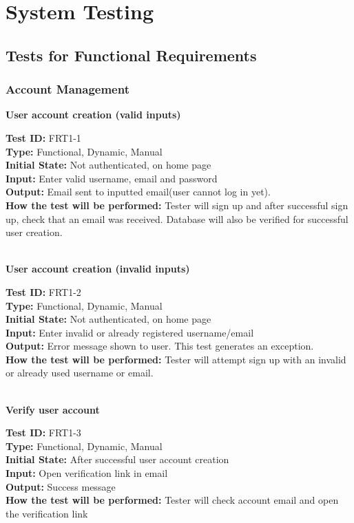 \documentclass[12pt,fleqn]{article}
\begin{document}
\pagebreak
\section{System Testing}
\subsection{Tests for Functional Requirements}
\subsubsection{Account Management}

\textbf{User account creation (valid inputs)}
\begin{tcolorbox}
\textbf{Test ID:} FRT1-1\\
\textbf{Type:} Functional, Dynamic, Manual\\
\textbf{Initial State:} Not authenticated, on home page\\
\textbf{Input:} Enter valid username, email and password\\
\textbf{Output:} Email sent to inputted email(user cannot log in yet). \\
\textbf{How the test will be performed:} Tester will sign up and after successful sign up, check that an email was received. Database will also be verified for successful user creation.
\end{tcolorbox}

\textbf{\\User account creation (invalid inputs)}
\begin{tcolorbox}
\textbf{Test ID:} FRT1-2\\
\textbf{Type:} Functional, Dynamic, Manual\\
\textbf{Initial State:} Not authenticated, on home page\\
\textbf{Input:} Enter invalid or already registered username/email\\
\textbf{Output:} Error message shown to user.  This test generates an exception.\\
\textbf{How the test will be performed:} Tester will attempt sign up with an invalid or already used username or email.
\end{tcolorbox}

\textbf{\\Verify user account}
\begin{tcolorbox}
\textbf{Test ID:} FRT1-3\\
\textbf{Type:} Functional, Dynamic, Manual\\
\textbf{Initial State:} After successful user account creation\\
\textbf{Input:} Open verification link in email \\
\textbf{Output:} Success message \\
\textbf{How the test will be performed:} Tester will check account email and open the verification link
\end{tcolorbox}
\end{document}
